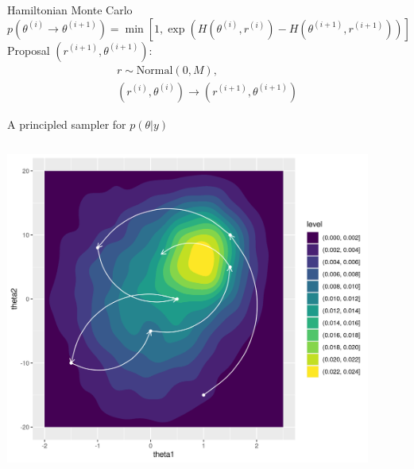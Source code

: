 \documentclass[bigger]{beamer}
\begin{document}
\begin{frame}[label={sec:orge149773}]{Hamiltonian Monte Carlo}
\begin{equation*}
  p(\theta^{(i)} \rightarrow \theta^{(i+1)}) =\min\left[
    1, \exp{(H(\theta^{(i)}, r^{(i)}) - H(\theta^{(i+1)}, r^{(i+1)}))}
  \right]
\end{equation*}
Proposal \((r^{(i+1)}, \theta^{(i+1)})\):
\begin{align*}
  r \sim \text{Normal}(0, M),\\
  (r^{(i)}, \theta^{(i)}) \rightarrow (r^{(i+1)}, \theta^{(i+1)})
\end{align*}
\end{frame}


\begin{frame}[label={sec:org2454474}]{A principled sampler for \(p(\theta|y)\)}
\begin{columns}
\begin{column}{0.8\columnwidth}
\begin{center}
\includegraphics[width=0.9\textwidth]{./figure/sampler_path.png}
\end{center}
\end{column}


\end{columns}
\end{frame}
\end{document}
